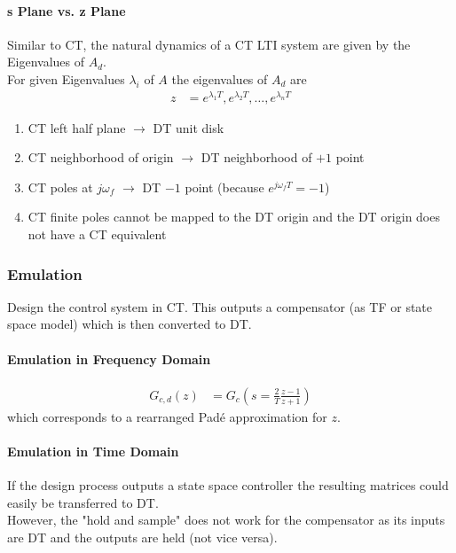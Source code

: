 \paragraph{s Plane vs. z Plane}
Similar to CT, the natural dynamics of a CT LTI system are given by the Eigenvalues of $A_d$.\\
For given Eigenvalues $\lambda_i$ of $A$ the eigenvalues of $A_d$ are
\noindent\begin{align*}
    z & =e^{\lambda_1T},e^{\lambda_2T},\ldots,e^{\lambda_nT}
\end{align*}

\begin{enumerate}
    \item CT left half plane $\rightarrow$ DT unit disk
    \item CT neighborhood of origin $\rightarrow$ DT neighborhood of $+1$ point
    \item CT poles at $j\omega_f$ $\rightarrow$ DT $-1$ point (because $e^{j\omega_fT}=-1$)
    \item CT finite poles cannot be mapped to the DT origin and the DT origin does not have a CT equivalent
\end{enumerate}
\subsubsection{Emulation}
Design the control system in CT. This outputs a compensator (as TF or state space model) which is then converted to DT.
\paragraph{Emulation in Frequency Domain}

\noindent\begin{align*}
    G_{c,d}(z) & =G_{c}\left(s=\frac2T\frac{z-1}{z+1}\right)
\end{align*}
which corresponds to a rearranged Padé approximation for $z$.
\paragraph{Emulation in Time Domain}
If the design process outputs a state space controller the resulting matrices could easily be transferred to DT.\\
However, the "hold and sample" does not work for the compensator as its inputs are DT and the outputs are held (not vice versa).\\

